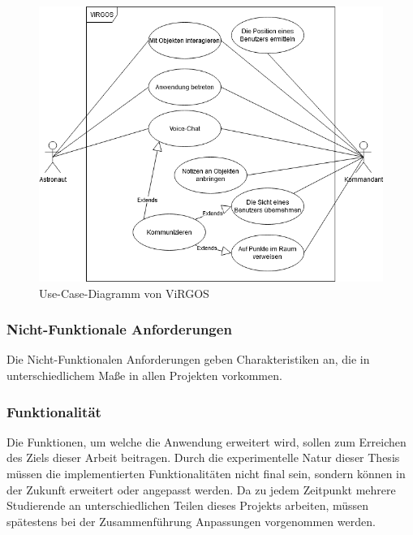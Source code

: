 \begin{figure}[H]
\centering
\includegraphics[width=1\textwidth]{ViRGOS_UseCase.png}
\caption{Use-Case-Diagramm von ViRGOS}
\end{figure}

\subsubsection{Nicht-Funktionale Anforderungen}
Die Nicht-Funktionalen Anforderungen geben Charakteristiken an, die in unterschiedlichem Maße in allen Projekten vorkommen.

\subsubsection*{Funktionalität}
Die Funktionen, um welche die Anwendung erweitert wird, sollen zum Erreichen des Ziels dieser Arbeit beitragen. Durch die experimentelle Natur dieser Thesis müssen die implementierten Funktionalitäten nicht final sein, sondern können in der Zukunft erweitert oder angepasst werden. Da zu jedem Zeitpunkt mehrere Studierende an unterschiedlichen Teilen dieses Projekts arbeiten, müssen spätestens bei der Zusammenführung Anpassungen vorgenommen werden.

